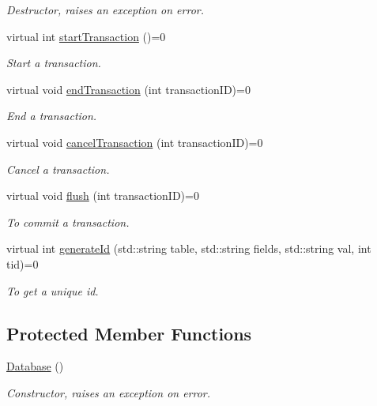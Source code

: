 \begin{DoxyCompactItemize}
\begin{DoxyCompactList}\small\item\em Destructor, raises an exception on error. \item\end{DoxyCompactList}\item 
virtual int \hyperlink{classDatabase_afd54fc087caf27f2636f2e535691e8c2}{startTransaction} ()=0
\begin{DoxyCompactList}\small\item\em Start a transaction. \item\end{DoxyCompactList}\item 
virtual void \hyperlink{classDatabase_a5d90789cdc650feede851c90bd48168d}{endTransaction} (int transactionID)=0
\begin{DoxyCompactList}\small\item\em End a transaction. \item\end{DoxyCompactList}\item 
virtual void \hyperlink{classDatabase_a16849263b31bf827ff1421d9df980196}{cancelTransaction} (int transactionID)=0
\begin{DoxyCompactList}\small\item\em Cancel a transaction. \item\end{DoxyCompactList}\item 
virtual void \hyperlink{classDatabase_a0dc84deddb8aab9d54817484a7c58400}{flush} (int transactionID)=0
\begin{DoxyCompactList}\small\item\em To commit a transaction. \item\end{DoxyCompactList}\item 
virtual int \hyperlink{classDatabase_ac17618be411cc0a017d830ab56b4e31f}{generateId} (std::string table, std::string fields, std::string val, int tid)=0
\begin{DoxyCompactList}\small\item\em To get a unique id. \item\end{DoxyCompactList}\end{DoxyCompactItemize}
\subsection*{Protected Member Functions}
\begin{DoxyCompactItemize}
\item 
\hypertarget{classDatabase_a4703c80e6969d33565ea340f768fdadf}{
\hyperlink{classDatabase_a4703c80e6969d33565ea340f768fdadf}{Database} ()}
\label{classDatabase_a4703c80e6969d33565ea340f768fdadf}

\begin{DoxyCompactList}\small\item\em Constructor, raises an exception on error. \item\end{DoxyCompactList}\end{DoxyCompactItemize}
